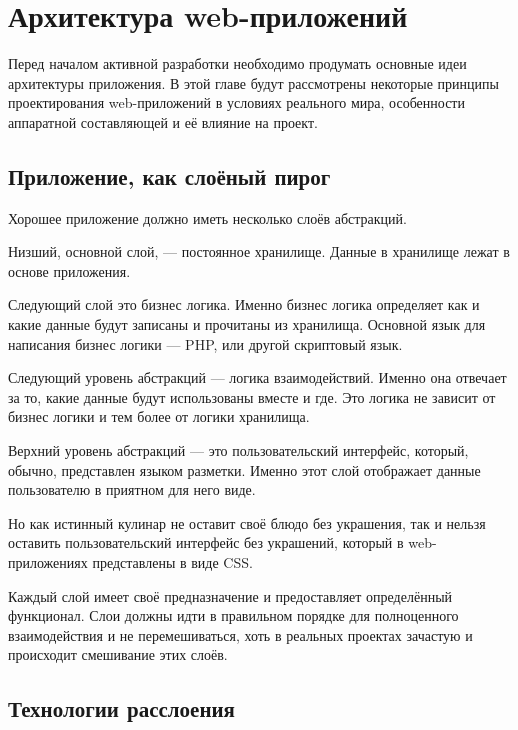 \chapter{ Архитектура web-приложений } \label{chapt2}


Перед началом активной разработки необходимо продумать основные идеи архитектуры приложения. В этой главе будут рассмотрены некоторые принципы проектирования web-приложений в условиях реального мира, особенности аппаратной составляющей и её влияние на проект.

\section{ Приложение, как слоёный пирог} \label{sect2_1}

Хорошее приложение должно иметь несколько слоёв абстракций.

Низший, основной слой, --- постоянное хранилище. Данные в хранилище лежат в основе приложения. 


Следующий слой это бизнес логика. Именно бизнес логика определяет как  и какие данные будут записаны и прочитаны из хранилища. Основной язык для написания бизнес логики --- PHP, или другой скриптовый язык.

Следующий уровень абстракций --- логика взаимодействий. Именно она отвечает за то, какие данные будут использованы вместе и где. Это логика не зависит от бизнес логики и тем более от логики хранилища.

Верхний уровень абстракций --- это пользовательский интерфейс, который, обычно, представлен языком разметки. Именно этот слой отображает данные пользователю в приятном для него виде.

Но как истинный кулинар не оставит своё блюдо без украшения, так и нельзя оставить пользовательский интерфейс без украшений, который в web-приложениях представлены в виде CSS.

Каждый слой имеет своё предназначение и предоставляет определённый функционал. Слои должны идти в правильном порядке для полноценного взаимодействия и не перемешиваться, хоть в реальных проектах зачастую и происходит смешивание этих слоёв.

\section{ Технологии расслоения } \label{sect2_2}

